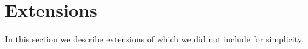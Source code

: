 
\section{Extensions}\label{sec:extensions}
In this section we describe extensions of \saik which we did not include for simplicity.%





